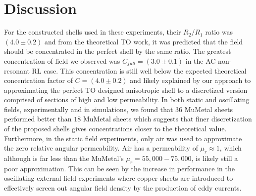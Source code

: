 \documentclass[11pt]{iopart}
\begin{document}

\section{Discussion}

For the constructed shells used in these experiments, their $R_2/R_1$
ratio was $(4.0\pm0.2)$ and from the theoretical TO work, it was
predicted that the field should be concentrated in the perfect shell
by the same ratio. The greatest concentration of field we observed was
$C_{full} = (3.0\pm0.1)$ in the AC non-resonant RL case. This concentration is
still well below the expected theoretical concentration factor of $C = (4.0
\pm 0.2)$ and likely explained by our approach to approximating the
perfect TO designed anisotropic shell to a discretized version
comprised of sections of high and low permeability.  In both static
and oscillating fields, experimentally and in simulations, we found
that $36$ MuMetal sheets performed better than $18$ MuMetal sheets
which suggests that finer discretization of the proposed shells gives
concentrations closer to the theoretical value. Furthermore, in the
static field experiments, only air was used to approximate the zero
relative angular permeability. Air has a permeability of $\mu_r
\approx 1$, which although is far less than the MuMetal's $\mu_r =
55,000-75,000 $, is likely still a poor approximation. This can be
seen by the increase in performance in the oscillating external field
experiments where copper sheets are introduced to effectively
screen out angular field density by the production of eddy
currents.
\end{document}
